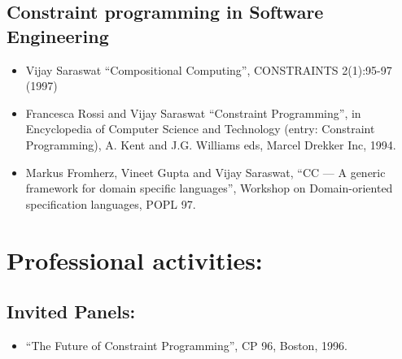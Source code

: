 \documentclass{article}
\begin{document}
\subsection*{Constraint programming in Software Engineering}
\begin{itemize} 
\item    Vijay Saraswat ``Compositional Computing'', CONSTRAINTS
    2(1):95-97 (1997)


\item Francesca Rossi and Vijay Saraswat ``Constraint Programming'',
in Encyclopedia of Computer Science and Technology (entry: Constraint
Programming), A. Kent and J.G.{} Williams eds, Marcel Drekker Inc,
1994.

\item    Markus Fromherz, Vineet Gupta and Vijay Saraswat, ``CC
     --- A  generic framework for domain specific languages'',
    Workshop  on Domain-oriented specification languages, POPL 97.
\end{itemize} 

\section*{Professional activities:}

\subsection*{Invited Panels:}
\begin{itemize}
\item  ``The Future of Constraint Programming'', CP 96, Boston, 1996.
\end{itemize}
\end{document}
